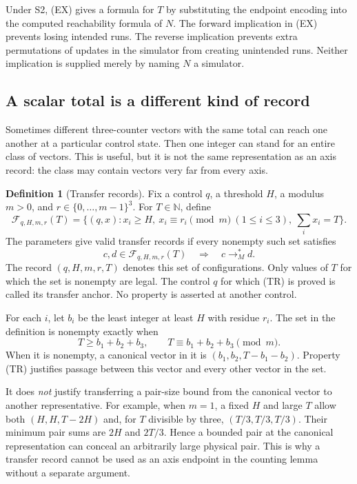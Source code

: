 \documentclass[11pt,a4paper]{article}
\theoremstyle{definition}
\newtheorem{definition}[theorem]{Definition}
\theoremstyle{remark}
\newcommand{\N}{\mathbb N}
\begin{document}
Under S2, (EX) gives a formula for \(T\) by substituting the endpoint
encoding into the computed reachability formula of \(N\).
The forward implication in (EX) prevents losing intended runs.
The reverse implication prevents extra permutations of updates in
the simulator from creating unintended runs.
Neither implication is supplied merely by naming \(N\) a simulator.

\subsection{A scalar total is a different kind of record}

Sometimes different three-counter vectors with the same total can
reach one another at a particular control state. Then one integer
can stand for an entire class of vectors. This is useful, but it is
not the same representation as an axis record: the class may contain
vectors very far from every axis.

\begin{definition}[Transfer records]
\label{def:transfer-record}
Fix a control \(q\), a threshold \(H\), a modulus \(m>0\), and
\(r\in\{0,\ldots,m-1\}^3\). For \(T\in\N\), define
\[
 \mathcal F_{q,H,m,r}(T)
 =\{(q,x):x_i\ge H,\ x_i\equiv r_i\pmod m\ (1\le i\le3),
                        \ \textstyle\sum_i x_i=T\}.
\]
The parameters give valid transfer records if every nonempty such
set satisfies
\[
 c,d\in\mathcal F_{q,H,m,r}(T)
       \quad\Longrightarrow\quad c\longrightarrow_M^*d.
 \tag{TR}
\]
The record \((q,H,m,r,T)\) denotes this set of configurations.
Only values of \(T\) for which the set is nonempty are legal.
The control \(q\) for which (TR) is proved is called its transfer
anchor. No property is asserted at another control.
\end{definition}

For each \(i\), let \(b_i\) be the least integer at least \(H\) with
residue \(r_i\). The set in the definition is nonempty exactly when
\[
 T\ge b_1+b_2+b_3,\qquad
 T\equiv b_1+b_2+b_3\pmod m.
\]
When it is nonempty, a canonical vector in it is
\((b_1,b_2,T-b_1-b_2)\).
Property (TR) justifies passage between this vector and every other
vector in the set.

It does \emph{not} justify transferring a pair-size bound from the
canonical vector to another representative. For example, when
\(m=1\), a fixed \(H\) and large \(T\) allow both
\((H,H,T-2H)\) and, for \(T\) divisible by three,
\((T/3,T/3,T/3)\). Their minimum pair sums are \(2H\) and \(2T/3\).
Hence a bounded pair at the canonical representation can conceal an
arbitrarily large physical pair. This is why a transfer record cannot
be used as an axis endpoint in the counting lemma without a separate
argument.
\end{document}

